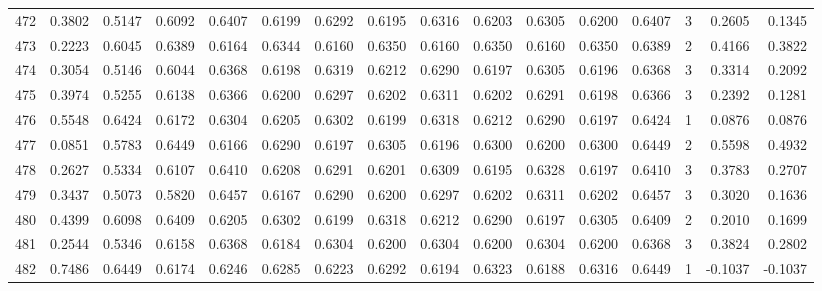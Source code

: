 \begin{tabular}{lrrrrrrrrrrrrrrr}
472 &      0.3802 &  0.5147 &  0.6092 &  0.6407 &  0.6199 &  0.6292 &  0.6195 &  0.6316 &  0.6203 &  0.6305 &   0.6200 &     0.6407 &      3 &                    0.2605 &                     0.1345 \\
473 &      0.2223 &  0.6045 &  0.6389 &  0.6164 &  0.6344 &  0.6160 &  0.6350 &  0.6160 &  0.6350 &  0.6160 &   0.6350 &     0.6389 &      2 &                    0.4166 &                     0.3822 \\
474 &      0.3054 &  0.5146 &  0.6044 &  0.6368 &  0.6198 &  0.6319 &  0.6212 &  0.6290 &  0.6197 &  0.6305 &   0.6196 &     0.6368 &      3 &                    0.3314 &                     0.2092 \\
475 &      0.3974 &  0.5255 &  0.6138 &  0.6366 &  0.6200 &  0.6297 &  0.6202 &  0.6311 &  0.6202 &  0.6291 &   0.6198 &     0.6366 &      3 &                    0.2392 &                     0.1281 \\
476 &      0.5548 &  0.6424 &  0.6172 &  0.6304 &  0.6205 &  0.6302 &  0.6199 &  0.6318 &  0.6212 &  0.6290 &   0.6197 &     0.6424 &      1 &                    0.0876 &                     0.0876 \\
477 &      0.0851 &  0.5783 &  0.6449 &  0.6166 &  0.6290 &  0.6197 &  0.6305 &  0.6196 &  0.6300 &  0.6200 &   0.6300 &     0.6449 &      2 &                    0.5598 &                     0.4932 \\
478 &      0.2627 &  0.5334 &  0.6107 &  0.6410 &  0.6208 &  0.6291 &  0.6201 &  0.6309 &  0.6195 &  0.6328 &   0.6197 &     0.6410 &      3 &                    0.3783 &                     0.2707 \\
479 &      0.3437 &  0.5073 &  0.5820 &  0.6457 &  0.6167 &  0.6290 &  0.6200 &  0.6297 &  0.6202 &  0.6311 &   0.6202 &     0.6457 &      3 &                    0.3020 &                     0.1636 \\
480 &      0.4399 &  0.6098 &  0.6409 &  0.6205 &  0.6302 &  0.6199 &  0.6318 &  0.6212 &  0.6290 &  0.6197 &   0.6305 &     0.6409 &      2 &                    0.2010 &                     0.1699 \\
481 &      0.2544 &  0.5346 &  0.6158 &  0.6368 &  0.6184 &  0.6304 &  0.6200 &  0.6304 &  0.6200 &  0.6304 &   0.6200 &     0.6368 &      3 &                    0.3824 &                     0.2802 \\
482 &      0.7486 &  0.6449 &  0.6174 &  0.6246 &  0.6285 &  0.6223 &  0.6292 &  0.6194 &  0.6323 &  0.6188 &   0.6316 &     0.6449 &      1 &                   -0.1037 &                    -0.1037 \\

\end{tabular}
